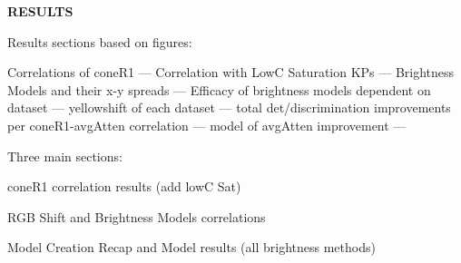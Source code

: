 \documentclass[12pt]{report}
\begin{document}
\doublespacing

\clearpage
\begin{centering}
\textbf{RESULTS}\\
\vspace{\baselineskip}
\end{centering}

Results sections based on figures:

Correlations of coneR1 --- 
Correlation with LowC Saturation KPs --- 
Brightness Models and their x-y spreads --- 
Efficacy of brightness models dependent on dataset --- 
yellowshift of each dataset --- 
total det/discrimination improvements per coneR1-avgAtten correlation --- 
model of avgAtten improvement --- 

Three main sections:

coneR1 correlation results (add lowC Sat)

RGB Shift and Brightness Models correlations

Model Creation Recap and Model results (all brightness methods)
\end{document}
